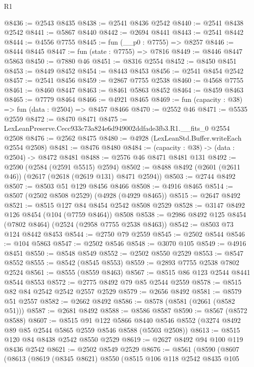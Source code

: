 \begin{lexlean}{R1}
\begin{coremodule}
@8436 := @2543 @8435
@8438 := @2541 @8436 @2542
@8440 := @2541 @8438 @2542
@8441 := @5867 @8440
@8442 := @2694 @8441
@8443 := @2541 @8442
@8444 := @4556 @7755
@8445 := fun (__p0 : @7755) => @8257
@8446 := @8444 @8445
@8447 := fun (state : @7755) => @7816
@8449 := @8446 @8447 @5863
@8450 := @7880 @46
@8451 := @8316 @2554
@8452 := @8450 @8451
@8453 := @8449 @8452
@8454 := @8443 @8453
@8456 := @2541 @8454 @2542
@8457 := @2541 @8456
@8459 := @2867 @7755 @2538
@8460 := @4568 @7755
@8461 := @8460 @8447
@8463 := @8461 @5863 @8452
@8464 := @8459 @8463
@8465 := @7779 @8464
@8466 := @4921 @8465
@8469 := fun (capacity : @38) => fun (data : @2504) => @8457 @8466
@8470 := @2552 @46
@8471 := @5535 @2559
@8472 := @8470 @8471
@8475 := LexLeanPreserve.Cecc933c73a824e6d949002ddfade3fb3.R1.__fits_0 @2554 @2508
@8476 := @2562 @8475
@8480 := @4928 (LexLeanStd.Buffer.writeEach @2554 @2508)
@8481 := @8476 @8480
@8484 := (capacity : @38) -> (data : @2504) -> @8472 @8481
@8488 := @2576 @46 @8471 @8481 @131
@8492 := @2590 (@2584 (@2591 @5515) @2594)
@8502 := @8488 @8492 (@2601 (@2611 @46)) (@2617 (@2618 (@2619 @131) @8471 @2594))
@8503 := @2744 @8492
@8507 := @8503 @51 @129 @8456 @8466
@8508 := @4916 @8465
@8514 := @8507 (@2502 @8508 @2529) (@4928 (@4929 @8465))
@8515 := @2647 @8492
@8521 := @8515 @127 @84 @8454 @2542 @8508 @2529
@8528 := @3147 @8492 @126 @8454 (@104 (@7759 @8464)) @8508
@8538 := @2986 @8492 @125 @8454 (@7802 @8464) (@2524 (@2958 @7755 @2538 @8463))
@8542 := @8503 @73 @124 @8442 @8453
@8544 := @2750 @79 @2559
@8545 := @2502 @8544
@8546 := @104 @5863
@8547 := @2502 @8546
@8548 := @3070 @105
@8549 := @4916 @8451
@8550 := @8548 @8549
@8552 := @2502 @8550 @2529
@8553 := @8547 @8552
@8555 := @8542 (@8545 @8553)
@8559 := @2893 @7755 @2538 @7802 @2524
@8561 := @8555 (@8559 @8463)
@8567 := @8515 @86 @123 @2544 @8441 @8544 @8553
@8572 := @2775 @8492 @79 @85 @2544 @2559
@8578 := @8515 @82 @84 @2542 @2542 @2557 @2529
@8579 := @2656 @8492
@8581 := @8579 @51 @2557
@8582 := @2662 @8492
@8586 := @8578 (@8581 (@2661 (@8582 @51)))
@8587 := @2681 @8492
@8588 := @8586 @8587
@8590 := @8567 (@8572 @8588)
@8607 := @8515
    @91
    @122
    @5866
    @8440
    @8546
    @8552
    (@3274 @8492 @89 @85 @2544 @5865 @2559 @8546 @8588 (@5503 @2508))
@8613 := @8515 @120 @84 @8438 @2542 @8550 @2529
@8619 := @2627 @8492 @94 @100 @119 @8436 @2542
@8621 := @2502 @8549 @2529
@8676 := @8561
    (@8590
      (@8607
        (@8613
          (@8619
            (@8345 @8621)
            @8550
            (@8515
              @106
              @118
              @2542
              @8435
              @105

\end{coremodule}
\end{lexlean}
